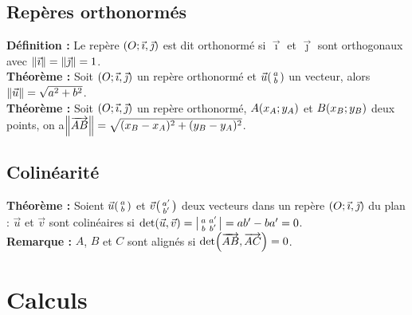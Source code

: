 \documentclass[a4paper,titlepage]{article}
\let\oldsection\section
\renewcommand\section{\clearpage\oldsection}
\let\oldleft\left
\renewcommand{\left}{\mathopen{}\mathclose\bgroup\oldleft}
\let\oldright\right
\renewcommand{\right}{\aftergroup\egroup\oldright}
\begin{document}
    \subsection{Repères orthonormés}
        \textbf{Définition :} Le repère $\left(O;\vec{\imath},\vec{\jmath}\right)$ est dit orthonormé si $\vec{\imath}$ et $\vec{\jmath}$ sont orthogonaux avec $\left\|\vec{\imath}\right\|=\left\|\vec{\jmath}\right\|=1$.
        \\
        \textbf{Théorème :} Soit $\left(O;\vec{\imath},\vec{\jmath}\right)$ un repère orthonormé et $\vec{u}\left(\begin{smallmatrix}a\\b\end{smallmatrix}\right)$ un vecteur, alors $\left\|\vec{u}\right\|=\sqrt{a^{2}+b^{2}}$.
        \\
        \textbf{Théorème :} Soit $\left(O;\vec{\imath},\vec{\jmath}\right)$ un repère orthonormé, $A\left(x_{A};y_{A}\right)$ et $B\left(x_{B};y_{B}\right)$ deux points, on a\linebreak$\left\|\overrightarrow{AB}\right\|=\sqrt{(x_{B}-x_{A})^{2}+(y_{B}-y_{A})^{2}}$.
    \subsection{Colinéarité}
        \textbf{Théorème :} Soient $\vec{u}\left(\begin{smallmatrix}a\\b\end{smallmatrix}\right)$ et $\vec{v}\left(\begin{smallmatrix}a^{\prime}\\b^{\prime}\end{smallmatrix}\right)$ deux vecteurs dans un repère $\left(O;\vec{\imath},\vec{\jmath}\right)$ du plan : $\vec{u}$ et $\vec{v}$ sont colinéaires si $\det\left(\vec{u},\vec{v}\right)=\left|\begin{smallmatrix}a&a^{\prime}\\b&b^{\prime}\end{smallmatrix}\right|=ab^{\prime}-ba^{\prime}=0$.
        \\
        \textbf{Remarque :} $A$, $B$ et $C$ sont alignés si $\det\left(\overrightarrow{AB},\overrightarrow{AC}\right)=0$.
\section{Calculs}
\end{document}

